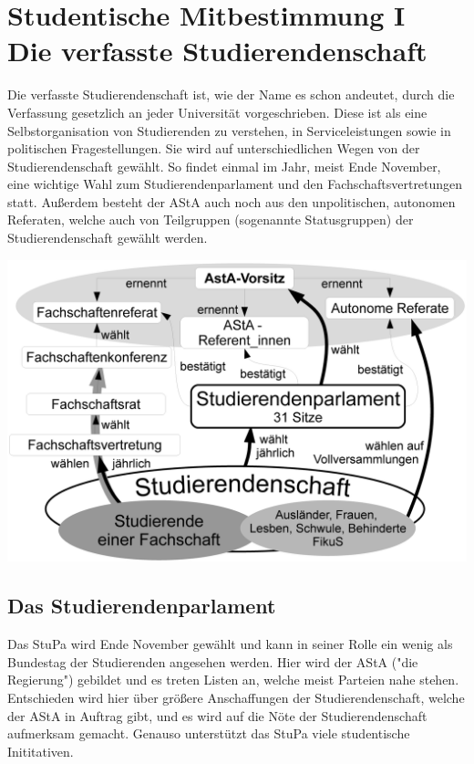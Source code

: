\section[Studentische Mitbestimmung]{Studentische Mitbestimmung I\\Die verfasste Studierendenschaft\label{studmit}}
\begin{multicols*}{2}
Die verfasste Studierendenschaft ist, wie der Name es schon andeutet, durch die Verfassung gesetzlich an jeder Universität vorgeschrieben. Diese ist als eine Selbstorganisation von Studierenden zu verstehen, in Serviceleistungen sowie in politischen Fragestellungen. Sie wird auf unterschiedlichen Wegen von der Studierendenschaft gewählt. So findet einmal im Jahr, meist Ende November, eine wichtige Wahl zum Studierendenparlament und den Fachschaftsvertretungen statt. Außerdem besteht der AStA auch noch aus den unpolitischen, autonomen Referaten, welche auch von Teilgruppen (sogenannte Statusgruppen) der Studierendenschaft gewählt werden.

\bigskip
\includegraphics[width=\columnwidth]{res/verfasste_studierendenschaft.png}
\bigskip

\subsection*{Das Studierendenparlament}
Das StuPa wird Ende November gewählt und kann in seiner Rolle ein wenig als Bundestag der Studierenden angesehen werden. Hier wird der AStA ("die Regierung") gebildet und es treten Listen an, welche meist Parteien nahe stehen. Entschieden wird hier über größere Anschaffungen der Studierendenschaft, welche der AStA in Auftrag gibt, und es wird auf die Nöte der Studierendenschaft aufmerksam gemacht. Genauso unterstützt das StuPa viele studentische Inititativen.


\end{multicols*}

